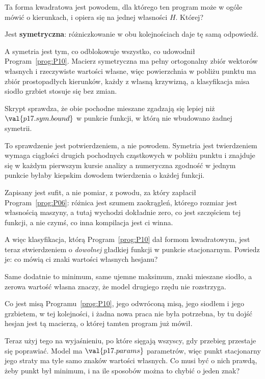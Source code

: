 \begin{fr}
Ta forma kwadratowa jest powodem, dla którego ten program może w ogóle mówić o
kierunkach, i opiera się na jednej własności $H$. Której?
\nextframe
\end{fr}

\begin{fr}
\begin{ansblock}
Jest \textbf{symetryczna}: różniczkowanie w obu kolejnościach daje tę samą
odpowiedź.
\end{ansblock}

A symetria jest tym, co odblokowuje wszystko, co udowodnił
Program~\ref{prog:P10}. Macierz symetryczna ma pełny ortogonalny zbiór
wektorów własnych i rzeczywiste wartości własne, więc powierzchnia w pobliżu
punktu ma zbiór prostopadłych kierunków, każdy z własną krzywizną, a
klasyfikacja misa \dash{} siodło \dash{} grzbiet stosuje się bez zmian.

Skrypt sprawdza, że obie pochodne mieszane zgadzają się lepiej niż
$\val{p17.sym.bound}$ w punkcie funkcji, w którą nie wbudowano żadnej symetrii.

\begin{note}
To sprawdzenie jest potwierdzeniem, a nie powodem. Symetria jest twierdzeniem
\dash{} wymaga ciągłości drugich pochodnych cząstkowych w pobliżu punktu i
znajduje się w każdym pierwszym kursie analizy \dash{} a numeryczna zgodność
w jednym punkcie byłaby kiepskim dowodem twierdzenia o każdej funkcji.

Zapisany jest sufit, a nie pomiar, z powodu, za który zapłacił
Program~\ref{prog:P06}: różnica jest szumem zaokrągleń, którego rozmiar jest
własnością maszyny, a tutaj wychodzi dokładnie zero, co jest szczęściem tej
funkcji, a nie czymś, co inna kompilacja jest ci winna.
\end{note}
\end{fr}

\begin{fr}
A więc klasyfikacja, którą Program~\ref{prog:P10} dał formom kwadratowym, jest
teraz stwierdzeniem o \emph{dowolnej} gładkiej funkcji w punkcie stacjonarnym.
Powiedz je: co mówią ci znaki wartości własnych hesjanu?
\dotline
\nextframe
\end{fr}

\begin{fr}
\begin{ansblock}
Same dodatnie to minimum, same ujemne maksimum, znaki mieszane siodło, a
zerowa wartość własna znaczy, że model drugiego rzędu nie rozstrzyga.
\end{ansblock}

Co jest misą Programu~\ref{prog:P10}, jego odwróconą misą, jego siodłem i jego
grzbietem, w tej kolejności, i żadna nowa praca nie była potrzebna, by tu
dojść \dash{} hesjan jest tą macierzą, o której tamten program już mówił.

Teraz użyj tego na wyjaśnieniu, po które sięgają wszyscy, gdy przebieg
przestaje się poprawiać. Model ma $\val{p17.params}$ parametrów, więc punkt
stacjonarny jego straty ma tyle samo znaków wartości własnych. Co musi być o
nich prawdą, żeby punkt był minimum, i na ile sposobów można to chybić o jeden
znak?
\dotline
\nextframe
\end{fr}

